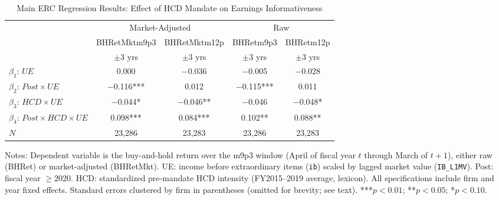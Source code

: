 \documentclass[12pt,english]{article}
\begin{document}
\begin{table}[ht]
\caption{Main ERC Regression Results: Effect of HCD Mandate on Earnings Informativeness}
\label{tab:estimates}
\centering
\begin{threeparttable}
\begin{tabular}{lcccc}
\toprule
 & \multicolumn{2}{c}{Market-Adjusted} & \multicolumn{2}{c}{Raw} \\
\cmidrule(lr){2-3}\cmidrule(lr){4-5}
 & BHRetMktm9p3 & BHRetMktm12p & BHRetm9p3 & BHRetm12p \\
 & $\pm$3 yrs   & $\pm$3 yrs   & $\pm$3 yrs & $\pm$3 yrs \\
\midrule
$\beta_1$: $UE$                     &  0.000  &$-$0.036 &$-$0.005 &$-$0.028 \\
$\beta_2$: $Post \times UE$          &$-$0.116***&  0.012 &$-$0.115***&  0.011 \\
$\beta_3$: $HCD \times UE$          &$-$0.044*&$-$0.046**&$-$0.046 &$-$0.048* \\
\midrule
$\beta_4$: $Post \times HCD \times UE$ & 0.098*** & 0.084*** & 0.102** & 0.088** \\
\midrule
$N$                                  & 23,286  & 23,283  & 23,286  & 23,283 \\
\bottomrule
\end{tabular}
\footnotesize{Notes: Dependent variable is the buy-and-hold return over the
m9p3 window (April of fiscal year $t$ through March of $t+1$), either raw
(BHRet) or market-adjusted (BHRetMkt). UE: income before extraordinary items
(\texttt{ib}) scaled by lagged market value (\texttt{IB\_L1MV}). Post: fiscal
year $\geq 2020$. HCD: standardized pre-mandate HCD intensity (FY2015--2019
average, \citet{demers2024} lexicon). All specifications include firm and year
fixed effects. Standard errors clustered by firm in parentheses (omitted for
brevity; see text). ***$p<0.01$; **$p<0.05$; *$p<0.10$.}
\end{threeparttable}
\end{table}
\end{document}
